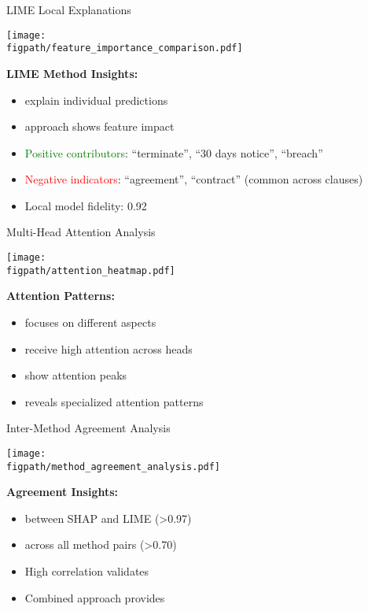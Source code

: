 \begin{frame}{LIME Local Explanations}
\begin{center}
\texttt{[image: \\figpath/feature\_importance\_comparison.pdf]}
\end{center}

\textbf{LIME Method Insights:}
\begin{itemize}
    \item {} explain individual predictions
    \item {} approach shows feature impact
    \item \textcolor{green}{Positive contributors}: ``terminate'', ``30 days notice'', ``breach''
    \item \textcolor{red}{Negative indicators}: ``agreement'', ``contract'' (common across clauses)
    \item Local model fidelity: 0.92
\end{itemize}
\end{frame}

\begin{frame}{Multi-Head Attention Analysis}
\begin{center}
\texttt{[image: \\figpath/attention\_heatmap.pdf]}
\end{center}

\textbf{Attention Patterns:}
\begin{itemize}
    \item {} focuses on different aspects
    \item {} receive high attention across heads
    \item {} show attention peaks
    \item {} reveals specialized attention patterns
\end{itemize}
\end{frame}

\begin{frame}{Inter-Method Agreement Analysis}
\begin{center}
\texttt{[image: \\figpath/method\_agreement\_analysis.pdf]}
\end{center}

\textbf{Agreement Insights:}
\begin{itemize}
    \item {} between SHAP and LIME (>0.97)
    \item {} across all method pairs (>0.70)
    \item High correlation validates 
    \item Combined approach provides 
\end{itemize}
\end{frame}

